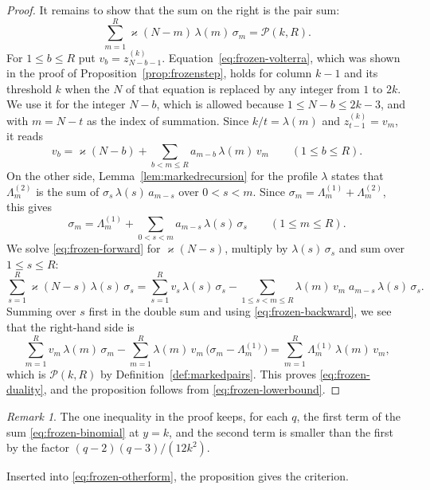 \documentclass{amsart}
\theoremstyle{definition}
\theoremstyle{remark}
\newtheorem*{remark}{Remark}
\numberwithin{equation}{section}
\begin{document}
\begin{proof}
It remains to show that the sum on the right is the pair sum:
\begin{equation}\label{eq:frozen-duality}
\sum_{m=1}^{R}\varkappa(N-m)\,\lambda(m)\,\sigma_m=\mathcal P(k,R).
\end{equation}
For $1\le b\le R$ put $v_b=z^{(k)}_{N-b-1}$.
Equation~\eqref{eq:frozen-volterra}, which was shown in the proof of
Proposition~\ref{prop:frozenstep}, holds for column $k-1$ and its
threshold $k$ when the $N$ of that equation is replaced by any integer from
$1$ to $2k$. We use it for the integer $N-b$, which is allowed because
$1\le N-b\le 2k-3$, and with $m=N-t$ as the index of summation. Since
$k/t=\lambda(m)$ and $z^{(k)}_{t-1}=v_m$, it reads
\begin{equation}\label{eq:frozen-forward}
v_b=\varkappa(N-b)+\sum_{b<m\le R}a_{m-b}\,\lambda(m)\,v_m
\qquad(1\le b\le R).
\end{equation}
On the other side, Lemma~\ref{lem:markedrecursion} for the profile $\lambda$
states that $\Lambda^{(2)}_m$ is the sum of
$\sigma_s\,\lambda(s)\,a_{m-s}$ over $0<s<m$. Since
$\sigma_m=\Lambda^{(1)}_m+\Lambda^{(2)}_m$, this gives
\begin{equation}\label{eq:frozen-backward}
\sigma_m=\Lambda^{(1)}_m+\sum_{0<s<m}a_{m-s}\,\lambda(s)\,\sigma_s
\qquad(1\le m\le R).
\end{equation}
We solve \eqref{eq:frozen-forward} for $\varkappa(N-s)$,
multiply by $\lambda(s)\,\sigma_s$ and sum over $1\le s\le R$:
\[
\sum_{s=1}^{R}\varkappa(N-s)\,\lambda(s)\,\sigma_s
=\sum_{s=1}^{R}v_s\,\lambda(s)\,\sigma_s
-\sum_{1\le s<m\le R}\lambda(m)\,v_m\;a_{m-s}\,\lambda(s)\,\sigma_s .
\]
Summing over $s$ first in the double sum and using
\eqref{eq:frozen-backward}, we see that the right-hand side is
\[
\sum_{m=1}^{R}v_m\,\lambda(m)\,\sigma_m
-\sum_{m=1}^{R}\lambda(m)\,v_m\,\bigl(\sigma_m-\Lambda^{(1)}_m\bigr)
=\sum_{m=1}^{R}\Lambda^{(1)}_m\,\lambda(m)\,v_m ,
\]
which is $\mathcal P(k,R)$ by Definition~\ref{def:markedpairs}. This proves
\eqref{eq:frozen-duality}, and the proposition follows from
\eqref{eq:frozen-lowerbound}.
\end{proof}

\begin{remark}
The one inequality in the proof keeps, for each $q$, the first term of the
sum \eqref{eq:frozen-binomial} at $y=k$, and the second term is smaller than
the first by the factor $(q-2)(q-3)/(12k^2)$.
\end{remark}

Inserted into \eqref{eq:frozen-otherform}, the proposition gives the
criterion.
\end{document}

